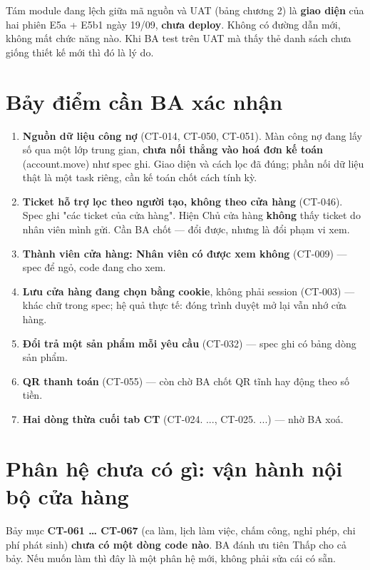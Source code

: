 \documentclass[11pt,a4paper]{report}
\newcommand{\rt}[1]{{\ttfamily\footnotesize #1}}
\begin{document}
Tám module đang lệch giữa mã nguồn và UAT (bảng chương 2) là \textbf{giao diện} của hai phiên
E5a + E5b1 ngày 19/09, \textbf{chưa deploy}. Không có đường dẫn mới, không mất chức năng nào.
Khi BA test trên UAT mà thấy thẻ danh sách chưa giống thiết kế mới thì đó là lý do.

\section{Bảy điểm cần BA xác nhận}
\label{sec:luuy}

\begin{enumerate}[leftmargin=*]
  \item \textbf{Nguồn dữ liệu công nợ} (CT-014, CT-050, CT-051). Màn công nợ đang lấy số qua
        một lớp trung gian, \textbf{chưa nối thẳng vào hoá đơn kế toán} (\rt{account.move}) như
        spec ghi. Giao diện và cách lọc đã đúng; phần nối dữ liệu thật là một task riêng, cần
        kế toán chốt cách tính kỳ.
  \item \textbf{Ticket hỗ trợ lọc theo người tạo, không theo cửa hàng} (CT-046). Spec ghi "các
        ticket của cửa hàng". Hiện Chủ cửa hàng \textbf{không} thấy ticket do nhân viên mình
        gửi. Cần BA chốt — đổi được, nhưng là đổi phạm vi xem.
  \item \textbf{Thành viên cửa hàng: Nhân viên có được xem không} (CT-009) — spec để ngỏ, code
        đang cho xem.
  \item \textbf{Lưu cửa hàng đang chọn bằng cookie}, không phải session (CT-003) — khác chữ
        trong spec; hệ quả thực tế: đóng trình duyệt mở lại vẫn nhớ cửa hàng.
  \item \textbf{Đổi trả một sản phẩm mỗi yêu cầu} (CT-032) — spec ghi có bảng dòng sản phẩm.
  \item \textbf{QR thanh toán} (CT-055) — còn chờ BA chốt QR tĩnh hay động theo số tiền.
  \item \textbf{Hai dòng thừa cuối tab CT} (\rt{CT-024. ...}, \rt{CT-025. ...}) — nhờ BA xoá.
\end{enumerate}

\section{Phân hệ chưa có gì: vận hành nội bộ cửa hàng}

Bảy mục \textbf{CT-061 … CT-067} (ca làm, lịch làm việc, chấm công, nghỉ phép, chi phí phát
sinh) \textbf{chưa có một dòng code nào}. BA đánh ưu tiên Thấp cho cả bảy. Nếu muốn làm thì đây
là một phân hệ mới, không phải sửa cái có sẵn.
\end{document}
